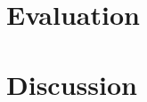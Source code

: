 \documentclass[a4paper,12pt]{article}
\begin{document}
\section{Evaluation}

\section{Discussion}


%
%


\end{document}

